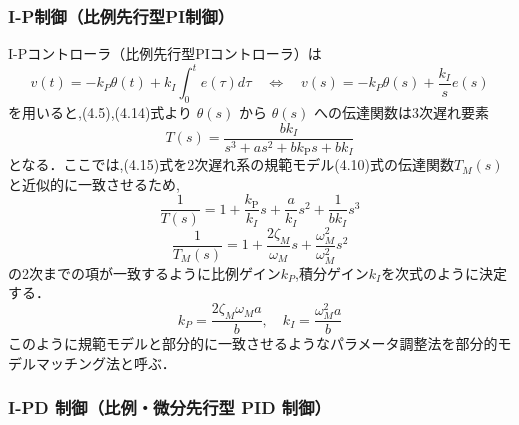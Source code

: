 \subsubsection{I-P制御（比例先行型PI制御）}
I-Pコントローラ（比例先行型PIコントローラ）は
\begin{equation}
  v(t) = -k_P \theta(t) + k_I \int_0^t e(\tau) d\tau \quad \Longleftrightarrow \quad v(s) = -k_P \theta(s) + \frac{k_I}{s} e(s) \tag{4.14}
\end{equation}
を用いると,(4.5),(4.14)式より \(\theta(s)\) から \(\theta(s)\) への伝達関数は3次遅れ要素
\begin{equation}
  T(s) = \frac{bk_I}{s^3 + as^2 + bk_{\mathrm{P}} s + bk_I} \tag{4.15}
\end{equation}
となる．ここでは,(4.15)式を2次遅れ系の規範モデル(4.10)式の伝達関数\(T_M(s)\)と近似的に一致させるため,
\begin{equation}
  \frac{1}{T(s)} = 1 + \frac{k_{\mathrm{P}}}{k_I}s + \frac{a}{k_I}s^2 + \frac{1}{bk_I}s^3 \tag{4.16}
\end{equation}
\begin{equation}
  \frac{1}{T_M(s)} = 1 + \frac{2\zeta_M}{\omega_M}s + \frac{\omega_M^2}{\omega_M^2}s^2 \tag{4.17}
\end{equation}
の2次までの項が一致するように比例ゲイン\(k_P\),積分ゲイン\(k_I\)を次式のように決定する．
\begin{equation}
  k_P = \frac{2\zeta_M \omega_M a}{b}, \quad k_I = \frac{\omega_M^2 a}{b} \tag{4.18}
\end{equation}
このように規範モデルと部分的に一致させるようなパラメータ調整法を部分的モデルマッチング法と呼ぶ．

\subsubsection{I-PD 制御（比例・微分先行型 PID 制御）}

